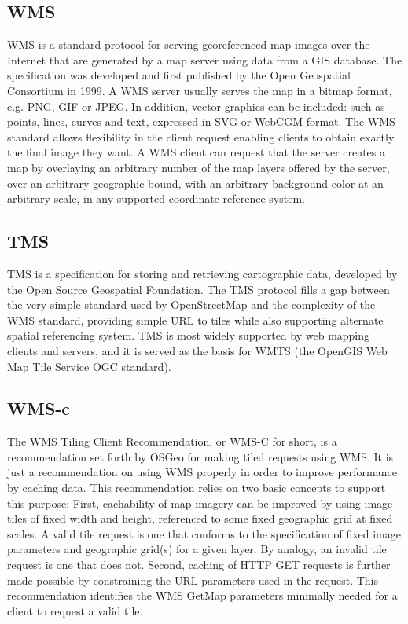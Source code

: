 \documentclass[11pt,a4paper,titlepage,oneside]{report}
\begin{document}
  \subsection{WMS}
    \acrfull{WMS} is a standard \gls{protocol} for serving georeferenced map images over the Internet that are generated by a map server using data from a GIS database. The specification was developed and first published by the Open Geospatial Consortium in 1999.
    A \gls{WMS} server usually serves the map in a bitmap format, e.g. \gls{PNG}, \gls{GIF} or \gls{JPEG}. In addition, vector graphics can be included: such as points, lines, curves and text, expressed in SVG or WebCGM format.
    The \gls{WMS} standard allows flexibility in the client request enabling clients to obtain exactly the final image they want. A \gls{WMS} client can request that the server creates a map by overlaying an arbitrary number of the map layers offered by the server, over an arbitrary geographic bound, with an arbitrary background color at an arbitrary scale, in any supported coordinate reference system.

  \subsection{TMS}
\gls{TMS} is a specification for storing and retrieving cartographic data, developed by the Open Source Geospatial Foundation. The \gls{TMS} \gls{protocol} fills a gap between the very simple standard used by OpenStreetMap and the complexity of the \gls{WMS} standard, providing simple \gls{URL} to tiles while also supporting alternate spatial referencing system.
    \gls{TMS} is most widely supported by web mapping clients and servers, and it is served as the basis for \gls{WMTS} (the OpenGIS Web Map Tile Service \gls{OGC} standard).

  \subsection{WMS-c}
    The WMS Tiling Client Recommendation, or WMS-C for short, is a recommendation set forth by OSGeo for making tiled requests using \gls{WMS}. It is just a recommendation on using \gls{WMS} properly in order to improve performance by caching data.
    This recommendation relies on two basic concepts to support this purpose: First, cachability of map imagery can be improved by using image tiles of fixed width and height, referenced to some fixed geographic grid at fixed scales. A valid tile request is one that conforms to the specification of fixed image parameters and geographic grid(s) for a given layer. By analogy, an invalid tile request is one that does not.
    Second, caching of \gls{HTTP} GET requests is further made possible by constraining the \gls{URL} parameters used in the request. This recommendation identifies the \gls{WMS} GetMap parameters minimally needed for a client to request a valid tile.
\end{document}

